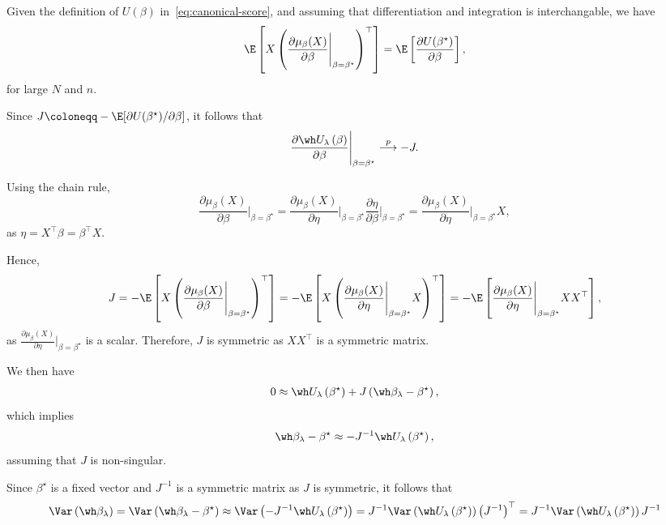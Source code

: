 \noindent
Given the definition of $U(\beta)$ in~\eqref{eq:canonical-score}, and assuming that differentiation and integration is interchangable, we have \[
\E\left[X\left(\frac{\partial \mu_{\beta}(X)}{\partial \beta}\Bigg\vert_{\beta=\beta^\star}\right)^\top\right]
=\E\left[\frac{\partial U(\beta^\star)}{\partial\beta}\right],
\]for large $N$ and $n$.


\noindent
Since $J\coloneqq -\E[\partial U(\beta^\star)/\partial\beta]$, it follows that\[
\frac{\partial \wh U_\lambda\left(\beta\right)}{\partial \beta}\Bigg\vert_{\beta=\beta^\star}\overset{p}{\longrightarrow}-J.
\]

\noindent
Using the chain rule,\[
\frac{\partial \mu_{\beta}(X)}{\partial \beta}\Bigg\vert_{\beta=\beta^\star}
=\frac{\partial \mu_{\beta}(X)}{\partial \eta}\Bigg\vert_{\beta=\beta^\star}
\frac{\partial \eta}{\partial \beta}\Bigg\vert_{\beta=\beta^\star}
=\frac{\partial \mu_{\beta}(X)}{\partial \eta}\Bigg\vert_{\beta=\beta^\star}X,
\]as $\eta=X^\top\beta=\beta^\top X$.

\noindent
Hence, \[
J=-\E\left[X\left(\frac{\partial \mu_{\beta}(X)}{\partial \beta}\Bigg\vert_{\beta=\beta^\star}\right)^\top\right]
=-\E\left[X\left(\frac{\partial \mu_{\beta}(X)}{\partial \eta}\Bigg\vert_{\beta=\beta^\star}X\right)^\top\right]
=-\E\left[\frac{\partial \mu_{\beta}(X)}{\partial \eta}\Bigg\vert_{\beta=\beta^\star}XX^\top\right],
\]as $\frac{\partial \mu_{\beta}(X)}{\partial \eta}\Bigg\vert_{\beta=\beta^\star}$ is a scalar. Therefore, $J$ is symmetric as $XX^\top$ is a symmetric matrix.

\noindent
We then have
\begin{align*}
    0\approx \wh U_\lambda\left(\beta^\star\right)+J\left(\wh\beta_\lambda-\beta^\star\right),
\end{align*} which implies 
\begin{align*}
    \wh\beta_\lambda-\beta^\star
    \approx-J^{-1}\wh U_\lambda\left(\beta^\star\right),
\end{align*}assuming that $J$ is non-singular.

\noindent
Since $\beta^\star$ is a fixed vector and $J^{-1}$ is a symmetric matrix as $J$ is symmetric, it follows that\[
\Var\left(\wh\beta_\lambda\right)
=\Var\left(\wh\beta_\lambda-\beta^\star\right)
\approx\Var\left(-J^{-1}\wh U_\lambda\left(\beta^\star\right)\right)
=J^{-1}\Var\left(\wh U_\lambda\left(\beta^\star\right)\right)\left(J^{-1}\right)^\top
=J^{-1}\Var\left(\wh U_\lambda\left(\beta^\star\right)\right)J^{-1}
\]

